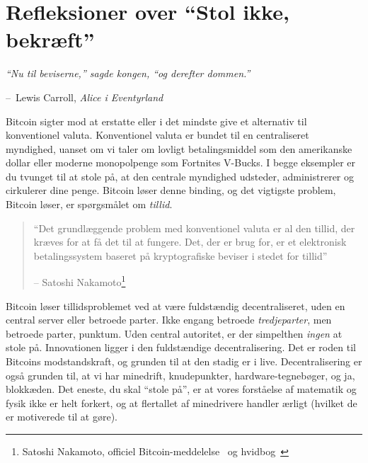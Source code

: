 \documentclass[paper=6in:9in,pagesize=pdftex,headinclude=on,footinclude=on,12pt]{scrbook}
\makeatletter
\newenvironment{chapquote}[2][4em]{\setlength{\@tempdima}{#1}%
   \def\chapquote@author{#2}%
   \parshape 1 \@tempdima \dimexpr\textwidth-2\@tempdima\relax%
   \itshape}{\par\normalfont\hfill--\ \chapquote@author\hspace*{\@tempdima}\par\bigskip}
\makeatother
\begin{document}
\chapter{Refleksioner over \enquote{Stol ikke, bekræft}}
\label{les:16}

\begin{chapquote}{Lewis Carroll, \textit{Alice i Eventyrland}} \enquote{Nu til beviserne,} sagde kongen, \enquote{og derefter dommen.} \end{chapquote}

Bitcoin sigter mod at erstatte eller i det mindste give et alternativ til konventionel valuta. Konventionel valuta er bundet til en centraliseret myndighed, uanset om vi taler om lovligt betalingsmiddel som den amerikanske dollar eller moderne monopolpenge som Fortnites V-Bucks. I begge eksempler er du tvunget til at stole på, at den centrale myndighed udsteder, administrerer og cirkulerer dine penge. Bitcoin løser denne binding, og det vigtigste problem, Bitcoin løser, er spørgsmålet om \textit{tillid}.\begin{quotation}\begin{samepage} \enquote{Det grundlæggende problem med konventionel valuta er al den tillid, der kræves for at få det til at fungere. \href{...}{} Det, der er brug for, er et elektronisk betalingssystem baseret på kryptografiske beviser i stedet for tillid} \begin{flushright} -- Satoshi Nakamoto\footnote{Satoshi Nakamoto, officiel Bitcoin-meddelelse~\cite{bitcoin-announcement} og hvidbog~\cite{whitepaper}}
\end{flushright}\end{samepage}\end{quotation}

Bitcoin løser tillidsproblemet ved at være fuldstændig decentraliseret, uden en central server eller betroede parter. Ikke engang betroede \textit{tredjeparter}, men betroede parter, punktum. Uden central autoritet, er der simpelthen \textit{ingen} at stole på. Innovationen ligger i den fuldstændige decentralisering. Det er roden til Bitcoins modstandskraft, og grunden til at den stadig er i live. Decentralisering er også grunden til, at vi har minedrift, knudepunkter, hardware-tegnebøger, og ja, blokkæden. Det eneste, du skal \enquote{stole på}, er at vores forståelse af matematik og fysik ikke er helt forkert, og at flertallet af minedrivere handler ærligt (hvilket de er motiverede til at gøre).
\end{document}
